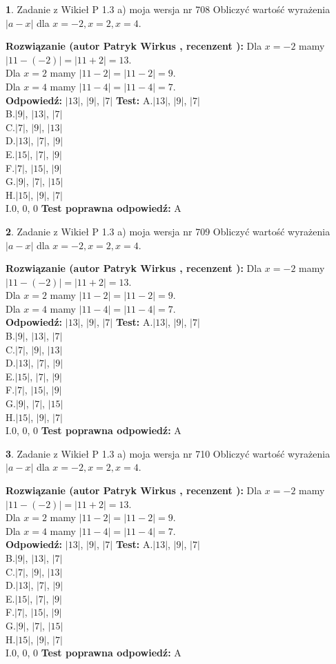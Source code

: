 \documentclass[12pt, a4paper]{article}
\theoremstyle{definition} %
\newtheorem{zad}{}
\newcommand{\zadStart}[1]{\begin{zad}#1\newline}
\newcommand{\zadStop}{\end{zad}}
\newcommand{\rozwStart}[2]{\noindent \textbf{Rozwiązanie (autor #1 , recenzent #2): }\newline}
\newcommand{\rozwStop}{\newline}
\newcommand{\odpStart}{\noindent \textbf{Odpowiedź:}\newline}
\newcommand{\odpStop}{\newline}
\newcommand{\testStart}{\noindent \textbf{Test:}\newline}
\newcommand{\testStop}{\newline}
\newcommand{\kluczStart}{\noindent \textbf{Test poprawna odpowiedź:}\newline}
\newcommand{\kluczStop}{\newline}
\begin{document}
\zadStart{Zadanie z Wikieł P 1.3 a) moja wersja nr 708}
Obliczyć wartość wyrażenia $|a - x|$ dla $x=-2,x=2,x=4$.
\zadStop
\rozwStart{Patryk Wirkus}{}
Dla $x = -2$ mamy $|11 - (-2)| = |11 + 2| = 13$.\\
Dla $x = 2$ mamy $|11 - 2| = |11 - 2| = 9$.\\
Dla $x = 4$ mamy $|11 - 4| = |11 - 4| = 7$.\\
\rozwStop
\odpStart
$|13|$, $|9|$, $|7|$
\odpStop
\testStart
A.$|13|$, $|9|$, $|7|$\\
B.$|9|$, $|13|$, $|7|$\\
C.$|7|$, $|9|$, $|13|$\\
D.$|13|$, $|7|$, $|9|$\\
E.$|15|$, $|7|$, $|9|$\\
F.$|7|$, $|15|$, $|9|$\\
G.$|9|$, $|7|$, $|15|$\\
H.$|15|$, $|9|$, $|7|$\\
I.$0$, $0$, $0$
\testStop
\kluczStart
A
\kluczStop



\zadStart{Zadanie z Wikieł P 1.3 a) moja wersja nr 709}
Obliczyć wartość wyrażenia $|a - x|$ dla $x=-2,x=2,x=4$.
\zadStop
\rozwStart{Patryk Wirkus}{}
Dla $x = -2$ mamy $|11 - (-2)| = |11 + 2| = 13$.\\
Dla $x = 2$ mamy $|11 - 2| = |11 - 2| = 9$.\\
Dla $x = 4$ mamy $|11 - 4| = |11 - 4| = 7$.\\
\rozwStop
\odpStart
$|13|$, $|9|$, $|7|$
\odpStop
\testStart
A.$|13|$, $|9|$, $|7|$\\
B.$|9|$, $|13|$, $|7|$\\
C.$|7|$, $|9|$, $|13|$\\
D.$|13|$, $|7|$, $|9|$\\
E.$|15|$, $|7|$, $|9|$\\
F.$|7|$, $|15|$, $|9|$\\
G.$|9|$, $|7|$, $|15|$\\
H.$|15|$, $|9|$, $|7|$\\
I.$0$, $0$, $0$
\testStop
\kluczStart
A
\kluczStop



\zadStart{Zadanie z Wikieł P 1.3 a) moja wersja nr 710}
Obliczyć wartość wyrażenia $|a - x|$ dla $x=-2,x=2,x=4$.
\zadStop
\rozwStart{Patryk Wirkus}{}
Dla $x = -2$ mamy $|11 - (-2)| = |11 + 2| = 13$.\\
Dla $x = 2$ mamy $|11 - 2| = |11 - 2| = 9$.\\
Dla $x = 4$ mamy $|11 - 4| = |11 - 4| = 7$.\\
\rozwStop
\odpStart
$|13|$, $|9|$, $|7|$
\odpStop
\testStart
A.$|13|$, $|9|$, $|7|$\\
B.$|9|$, $|13|$, $|7|$\\
C.$|7|$, $|9|$, $|13|$\\
D.$|13|$, $|7|$, $|9|$\\
E.$|15|$, $|7|$, $|9|$\\
F.$|7|$, $|15|$, $|9|$\\
G.$|9|$, $|7|$, $|15|$\\
H.$|15|$, $|9|$, $|7|$\\
I.$0$, $0$, $0$
\testStop
\kluczStart
A
\kluczStop
\end{document}
